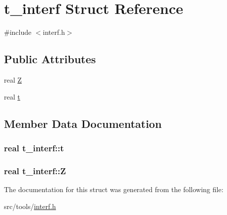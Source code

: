 \hypertarget{structt__interf}{\section{t\-\_\-interf \-Struct \-Reference}
\label{structt__interf}
}


{\ttfamily \#include $<$interf.\-h$>$}

\subsection*{\-Public \-Attributes}
\begin{DoxyCompactItemize}
\item 
real \hyperlink{structt__interf_a8127c390a34d60f0f88024d870ab1289}{\-Z}
\item 
real \hyperlink{structt__interf_a9b511ba358ca947b3a705ad64487b3dd}{t}
\end{DoxyCompactItemize}


\subsection{\-Member \-Data \-Documentation}
\hypertarget{structt__interf_a9b511ba358ca947b3a705ad64487b3dd}{
\subsubsection[{t}]{\setlength{\rightskip}{0pt plus 5cm}real {\bf t\-\_\-interf\-::t}}}\label{structt__interf_a9b511ba358ca947b3a705ad64487b3dd}
\hypertarget{structt__interf_a8127c390a34d60f0f88024d870ab1289}{
\subsubsection[{\-Z}]{\setlength{\rightskip}{0pt plus 5cm}real {\bf t\-\_\-interf\-::\-Z}}}\label{structt__interf_a8127c390a34d60f0f88024d870ab1289}


\-The documentation for this struct was generated from the following file\-:\begin{DoxyCompactItemize}
\item 
src/tools/\hyperlink{interf_8h}{interf.\-h}\end{DoxyCompactItemize}
